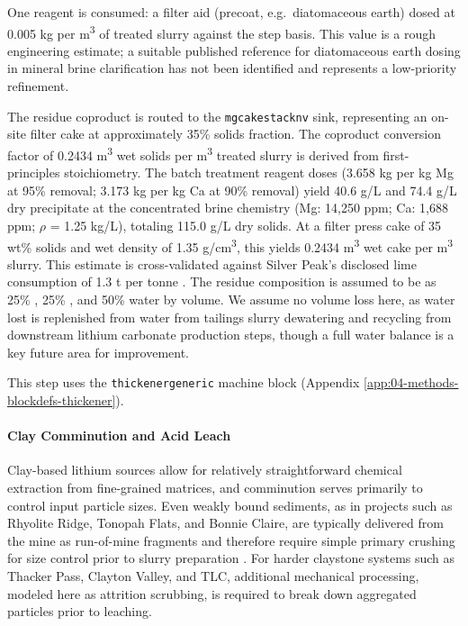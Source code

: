 \documentclass{article}
\renewcommand\_{\textunderscore\allowbreak}
\begin{document}
One reagent is consumed: a filter aid (precoat, e.g.\ diatomaceous earth) dosed at 0.005 kg per \si{m^3} of treated slurry against the step basis. This value is a rough engineering estimate; a suitable published reference for diatomaceous earth dosing in mineral brine clarification has not been identified and represents a low-priority refinement.

The residue coproduct is routed to the \texttt{mgcake\_stack\_nv\_35} sink, representing an on-site filter cake at approximately 35\% solids fraction. The coproduct conversion factor of 0.2434 \si{m^3} wet solids per \si{m^3} treated slurry is derived from first-principles stoichiometry. The batch treatment reagent doses (3.658 kg  per kg Mg at 95\% removal; 3.173 kg  per kg Ca at 90\% removal) yield 40.6 g/L  and 74.4 g/L  dry precipitate at the concentrated brine chemistry (Mg: 14,250 ppm; Ca: 1,688 ppm; $\rho$ = 1.25 kg/L), totaling 115.0 g/L dry solids. At a filter press cake of 35 wt\% solids and wet density of 1.35 \si{g/cm^3}, this yields 0.2434 \si{m^3} wet cake per \si{m^3} slurry. This estimate is cross-validated against Silver Peak's disclosed lime consumption of 1.3 t  per tonne . The residue composition is assumed to be as 25\% , 25\% , and 50\% water by volume. We assume no volume loss here, as water lost is replenished from water from tailings slurry dewatering and recycling from downstream lithium carbonate production steps, though a full water balance is a key future area for improvement. 

This step uses the \texttt{thickener\_generic} machine block (Appendix \ref{app:04-methods-blockdefs-thickener}).

\paragraph{Clay Comminution and Acid Leach}\label{app:04-methods-facilitychoices-clayleach}\leavevmode\par

Clay-based lithium sources allow for relatively straightforward chemical extraction from fine-grained matrices, and comminution serves primarily to control input particle sizes. Even weakly bound sediments, as in projects such as Rhyolite Ridge, Tonopah Flats, and Bonnie Claire, are typically delivered from the mine as run-of-mine fragments and therefore require simple primary crushing for size control prior to slurry preparation \citep{khakmardanLifeCycleAssessment2024, mousavinezhadNextLithiumBoom2025}. For harder claystone systems such as Thacker Pass, Clayton Valley, and TLC, additional mechanical processing, modeled here as attrition scrubbing, is required to break down aggregated particles prior to leaching.
\end{document}
